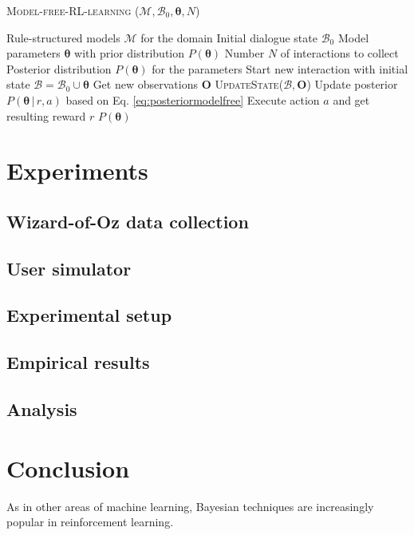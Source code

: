 \begin{algorithm}[h]
\caption{\textsc{Model-free-RL-learning} ($\mathcal{M}, \mathcal{B}_0, \boldsymbol\theta, N$)}
\begin{algorithmic}[1]\vspace{1mm}
\REQUIRE Rule-structured models $\mathcal{M}$ for the domain
\REQUIRE Initial dialogue state $\mathcal{B}_0$
\REQUIRE Model parameters $\boldsymbol\theta$ with prior distribution $P(\boldsymbol\theta)$
\REQUIRE Number $N$ of interactions to collect
\ENSURE Posterior distribution $P(\boldsymbol\theta)$ for the parameters  \vspace{1mm}
\STATE Start new interaction with initial state $\mathcal{B} = \mathcal{B}_0 \cup \boldsymbol\theta $
\STATE Get new observations $\mathbf{O}$
\STATE \textsc{UpdateState}($\mathcal{B}, \mathbf{O}$)
\STATE Update posterior $P(\boldsymbol\theta \, | \, r, a)$ based on Eq. \eqref{eq:posteriormodelfree}
\STATE Execute action $a$ and get resulting reward $r$
\ENDIF
\ENDWHILE
\ENDFOR
\RETURN $P(\boldsymbol\theta)$
\end{algorithmic} 
\label{algo:rllearning_modelfree}
\end{algorithm}


\section{Experiments}

\label{sec:rllearning-experiments}



\subsection{Wizard-of-Oz data collection}

\subsection{User simulator}

\subsection{Experimental setup}

\subsection{Empirical results}

\subsection{Analysis}


\section{Conclusion}

As in other areas of machine learning, Bayesian techniques are increasingly popular in reinforcement learning.
